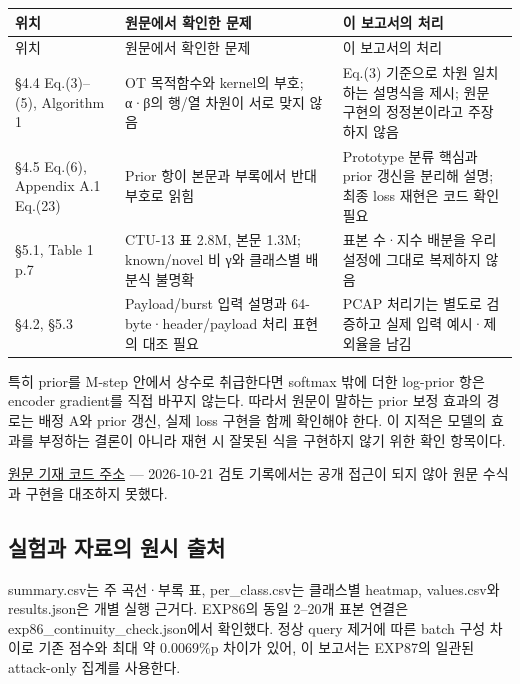 \begingroup
\footnotesize
\begin{longtable}{>{\raggedright\arraybackslash}p{}>{\raggedright\arraybackslash}p{}>{\raggedright\arraybackslash}p{}}
\toprule
위치 & 원문에서 확인한 문제 & 이 보고서의 처리 \\ \midrule
\endfirsthead
위치 & 원문에서 확인한 문제 & 이 보고서의 처리 \\ \midrule
\endhead
{}§4.4 Eq.(3)–(5), Algorithm 1 & OT 목적함수와 kernel의 부호; α·β의 행/\allowbreak{}열 차원이 서로 맞지 않음 & Eq.(3) 기준으로 차원 일치하는 설명식을 제시; 원문 구현의 정정본이라고 주장하지 않음 \\
{}§4.5 Eq.(6), Appendix A.1 Eq.(23) & Prior 항이 본문과 부록에서 반대 부호로 읽힘 & Prototype 분류 핵심과 prior 갱신을 분리해 설명; 최종 loss 재현은 코드 확인 필요 \\
{}§5.1, Table 1 p.7 & CTU-13 표 2.8M, 본문 1.3M; known/\allowbreak{}novel 비 γ와 클래스별 배분식 불명확 & 표본 수·지수 배분을 우리 설정에 그대로 복제하지 않음 \\
{}§4.2, §5.3 & Payload/\allowbreak{}burst 입력 설명과 64-byte·header/\allowbreak{}payload 처리 표현의 대조 필요 & PCAP 처리기는 별도로 검증하고 실제 입력 예시·제외율을 남김 \\
\bottomrule
\end{longtable}
\endgroup


특히 prior를 M-step 안에서 상수로 취급한다면 softmax 밖에 더한 log-prior 항은 encoder gradient를 직접 바꾸지 않는다. 따라서 원문이 말하는 prior 보정 효과의 경로는 배정 A와 prior 갱신, 실제 loss 구현을 함께 확인해야 한다. 이 지적은 모델의 효과를 부정하는 결론이 아니라 재현 시 잘못된 식을 구현하지 않기 위한 확인 항목이다.


\href{https://github.com/watsonhu-hpi/LotBoNC}{원문 기재 코드 주소} — 2026-10-21 검토 기록에서는 공개 접근이 되지 않아 원문 수식과 구현을 대조하지 못했다.


\subsection{실험과 자료의 원시 출처}


summary.csv는 주 곡선·부록 표, per\_\allowbreak{}class.csv는 클래스별 heatmap, values.csv와 results.json은 개별 실행 근거다. EXP86의 동일 2–20개 표본 연결은 exp86\_\allowbreak{}continuity\_\allowbreak{}check.json에서 확인했다. 정상 query 제거에 따른 batch 구성 차이로 기존 점수와 최대 약 0.0069\%p 차이가 있어, 이 보고서는 EXP87의 일관된 attack-only 집계를 사용한다.


